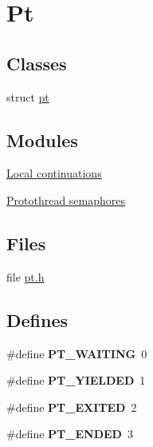 \hypertarget{group__pt}{
\section{Pt}
\label{group__pt}
}
\subsection*{Classes}
\begin{DoxyCompactItemize}
\item 
struct \hyperlink{structpt}{pt}
\end{DoxyCompactItemize}
\subsection*{Modules}
\begin{DoxyCompactItemize}
\item 
\hyperlink{group__lc}{Local continuations}
\item 
\hyperlink{group__ptsem}{Protothread semaphores}
\end{DoxyCompactItemize}
\subsection*{Files}
\begin{DoxyCompactItemize}
\item 
file \hyperlink{pt_8h}{pt.h}
\end{DoxyCompactItemize}
\subsection*{Defines}
\begin{DoxyCompactItemize}
\item 
\hypertarget{group__pt_ga7b5319b5b65761a845fcd1500fde4cdc}{
\#define {\bfseries PT\_\-WAITING}~0}
\label{group__pt_ga7b5319b5b65761a845fcd1500fde4cdc}

\item 
\hypertarget{group__pt_gae469332907e0617d72d5e2dd4297119d}{
\#define {\bfseries PT\_\-YIELDED}~1}
\label{group__pt_gae469332907e0617d72d5e2dd4297119d}

\item 
\hypertarget{group__pt_gacfae9053e5c107a1aed6b228c917d2ea}{
\#define {\bfseries PT\_\-EXITED}~2}
\label{group__pt_gacfae9053e5c107a1aed6b228c917d2ea}

\item 
\hypertarget{group__pt_ga9ff1e8936a8a26bff54c05f8a989b93b}{
\#define {\bfseries PT\_\-ENDED}~3}
\label{group__pt_ga9ff1e8936a8a26bff54c05f8a989b93b}

\end{DoxyCompactItemize}
